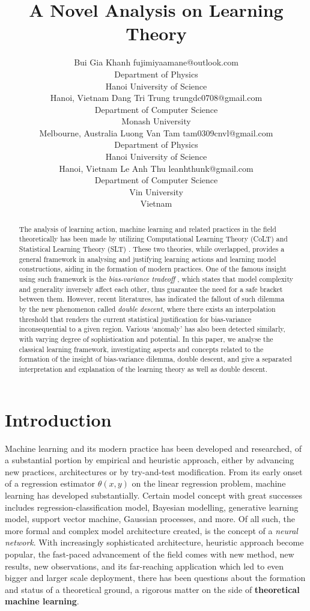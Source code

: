 \documentclass[10pt]{article}
\title{A Novel Analysis on Learning Theory}
\author{\name Bui Gia Khanh \email fujimiyaamane@outlook.com \\
       \addr Department of Physics\\
       Hanoi University of Science\\
       Hanoi, Vietnam
       \AND 
       \name Dang Tri Trung \email trungdc0708@gmail.com \\
        \addr Department of Computer Science\\
        Monash University \\
        Melbourne, Australia
       \AND 
       \name Luong Van Tam \email tam0309cnvl@gmail.com\\ 
       \addr Department of Physics \\
       Hanoi University of Science \\
       Hanoi, Vietnam
       \AND
       \name Le Anh Thu \email leanhthunk@gmail.com \\
       \addr Department of Computer Science \\
       Vin University \\
       Vietnam
       }
\begin{document}
\maketitle

\begin{abstract}
    The analysis of learning action, machine learning and related practices in the field theoretically has been made by utilizing Computational Learning Theory (CoLT) \cite{10.1145/1968.1972} and Statistical Learning Theory (SLT) \cite{Vapnik1999-VAPTNO}. These two theories, while overlapped, provides a general framework in analysing and justifying learning actions and learning model constructions, aiding in the formation of modern practices. One of the famous insight using such framework is the \textit{bias-variance tradeoff} \cite{6797087}, which states that model complexity and generality inversely affect each other, thus guarantee the need for a safe bracket between them. However, recent literatures, \cite{belkin_reconciling_2019} has indicated the fallout of such dilemma by the new phenomenon called \textit{double descent}, where there exists an interpolation threshold that renders the current statistical justification for bias-variance inconsequential to a given region. Various `anomaly' has also been detected similarly, with varying degree of sophistication and potential. In this paper, we analyse the classical learning framework, investigating aspects and concepts related to the formation of the insight of bias-variance dilemma, double descent, and give a separated interpretation and explanation of the learning theory as well as double descent. %
\end{abstract}



\section{Introduction}

Machine learning and its modern practice has been developed and researched, of a substantial portion by empirical and heuristic approach, either by advancing new practices, architectures or by try-and-test modification. From its early onset of a regression estimator $\theta(x,y)$ on the linear regression problem, machine learning has developed substantially. Certain model concept with great successes includes regression-classification model, Bayesian modelling, generative learning model, support vector machine, Gaussian processes, and more. Of all such, the more formal and complex model architecture created, is the concept of a \textit{neural network}. With increasingly sophisticated architecture, heuristic approach become popular, the fast-paced advancement of the field comes with new method, new results, new observations, and its far-reaching application which led to even bigger and larger scale deployment, there has been questions about the formation and status of a theoretical ground, a rigorous matter on the side of \textbf{theoretical machine learning}.
\end{document}
